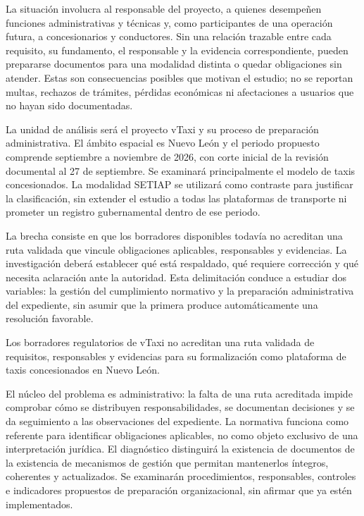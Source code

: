 {La situación involucra al responsable del proyecto, a quienes desempeñen funciones administrativas y técnicas y, como participantes de una operación futura, a concesionarios y conductores. Sin una relación trazable entre cada requisito, su fundamento, el responsable y la evidencia correspondiente, pueden prepararse documentos para una modalidad distinta o quedar obligaciones sin atender. Estas son consecuencias posibles que motivan el estudio; no se reportan multas, rechazos de trámites, pérdidas económicas ni afectaciones a usuarios que no hayan sido documentadas.


La unidad de análisis será el proyecto vTaxi y su proceso de preparación administrativa. El ámbito espacial es Nuevo León y el periodo propuesto comprende septiembre a noviembre de 2026, con corte inicial de la revisión documental al 27 de septiembre. Se examinará principalmente el modelo de taxis concesionados. La modalidad SETIAP se utilizará como contraste para justificar la clasificación, sin extender el estudio a todas las plataformas de transporte ni prometer un registro gubernamental dentro de ese periodo.


La brecha consiste en que los borradores disponibles todavía no acreditan una ruta validada que vincule obligaciones aplicables, responsables y evidencias. La investigación deberá establecer qué está respaldado, qué requiere corrección y qué necesita aclaración ante la autoridad. Esta delimitación conduce a estudiar dos variables: la gestión del cumplimiento normativo y la preparación administrativa del expediente, sin asumir que la primera produce automáticamente una resolución favorable.


Los borradores regulatorios de vTaxi no acreditan una ruta validada de requisitos, responsables y evidencias para su formalización como plataforma de taxis concesionados en Nuevo León.


El núcleo del problema es administrativo: la falta de una ruta acreditada impide comprobar cómo se distribuyen responsabilidades, se documentan decisiones y se da seguimiento a las observaciones del expediente. La normativa funciona como referente para identificar obligaciones aplicables, no como objeto exclusivo de una interpretación jurídica. El diagnóstico distinguirá la existencia de documentos de la existencia de mecanismos de gestión que permitan mantenerlos íntegros, coherentes y actualizados. Se examinarán procedimientos, responsables, controles e indicadores propuestos de preparación organizacional, sin afirmar que ya estén implementados.


}

